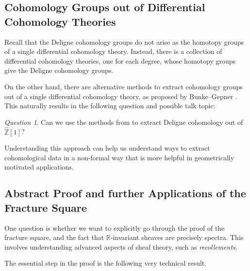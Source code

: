 \documentclass[a4paper]{book}
\newcommand{\bR}{\mathbb{R}}
\newcommand{\bZ}{\mathbb{Z}}
\theoremstyle{definition}
\theoremstyle{remark}
\newtheorem{question}[equation]{Question}
\numberwithin{equation}{section}
\begin{document}
\subsection{Cohomology Groups out of Differential Cohomology Theories} \label{subsec:groups}
Recall that the Deligne cohomology groups do not arise as the homotopy groups of a single differential cohomology theory. Instead, there is a collection of differential cohomology theories, one for each degree, whose homotopy groups give the Deligne cohomology groups.

On the other hand, there are alternative methods to extract cohomology groups out of a single differential cohomology theory, as proposed by Bunke--Gepner \cite[Definition 2.23]{bunkegepner2021diffktheory}. This naturally results in the following question and possible talk topic:

\begin{question}
 Can we use the methods from \cite{bunkegepner2021diffktheory} to extract Deligne cohomology out of $\hat{\bZ}[1]$?
\end{question}

Understanding this approach can help us understand ways to extract cohomological data in a non-formal way that is more helpful in geometrically motivated applications.

\subsection{Abstract Proof and further Applications of the Fracture Square} \label{subsec:abstract}
One question is whether we want to explicitly go through the proof of the fracture square, and the fact that $\bR$-invariant sheaves are precisely spectra. This involves understanding advanced aspects of sheaf theory, such as \emph{recollements}.

The essential step in the proof is the following very technical result.
\end{document}
